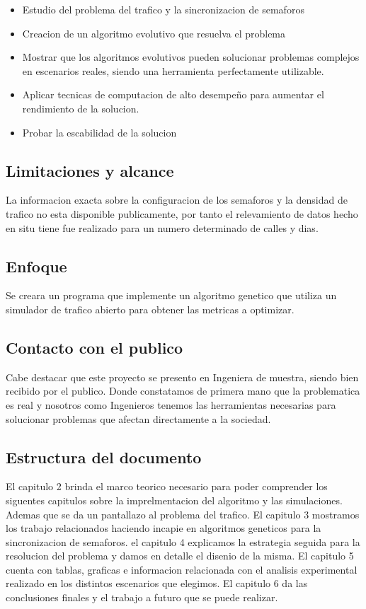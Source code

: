 \begin{itemize}
	\item Estudio del problema del trafico y la sincronizacion de semaforos
	\item Creacion de un algoritmo evolutivo que resuelva el problema
	\item Mostrar que los algoritmos evolutivos pueden solucionar problemas complejos en escenarios  reales, siendo una herramienta perfectamente utilizable.
	\item Aplicar tecnicas de computacion de alto desempeño para aumentar el rendimiento de la solucion.
	\item Probar la escabilidad de la solucion
\end{itemize}

\subsection{Limitaciones y alcance}
La informacion exacta sobre la configuracion de los semaforos y la densidad de trafico no esta disponible publicamente, por tanto el relevamiento de datos hecho en situ tiene fue realizado para un numero determinado de calles y dias.

 
\subsection{Enfoque}
Se creara un programa que implemente un algoritmo genetico  que utiliza un simulador de trafico abierto para obtener las metricas a optimizar.


\subsection{Contacto con el publico}
Cabe destacar que este proyecto se presento en Ingeniera de muestra, siendo bien recibido por el publico. Donde constatamos de primera mano que la problematica es real y nosotros como Ingenieros tenemos las herramientas necesarias para solucionar problemas que afectan directamente a la sociedad.

\subsection{Estructura del documento}
El capitulo 2 brinda el marco teorico necesario para poder comprender los siguentes capitulos sobre la imprelmentacion del algoritmo y las simulaciones. Ademas que se da un pantallazo al problema del trafico.
El capitulo 3 mostramos los trabajo relacionados haciendo incapie en algoritmos geneticos para la sincronizacion de semaforos.
el capitulo 4 explicamos la estrategia seguida para la resolucion del problema y damos en detalle el disenio de la misma.
El capitulo 5 cuenta con tablas, graficas e informacion relacionada con el analisis experimental realizado en los distintos escenarios que elegimos.
El capitulo 6 da las conclusiones finales y el trabajo a futuro que se puede realizar.






